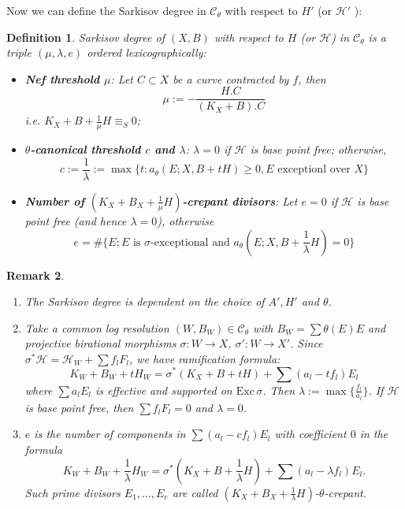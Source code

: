 \documentclass[11pt]{amsart}
\newtheorem{defn}{Definition}[section]
\newtheorem{rmk}[defn]{Remark}
\begin{document}
Now we can define the Sarkisov degree in $\mathcal{C}_{\theta}$ with respect to $H'$ (or $\mathcal{H}'$ ):
\begin{defn}\label{sarkisovdegree}
  \cite[Definition 3.8]{brunoLogSarkisovProgram1995}
  Sarkisov degree of $ (X,B) $ with respect to $ H $ (or $ \mathcal{H} $) in $ \mathcal{C}_\theta $ is a triple $ (\mu,\lambda,e) $ ordered lexicographically:
  \begin{itemize}
    \item \textbf{Nef threshold $ \mu $}: Let $ C\subset X  $ be a curve contracted by $ f $, then 
      \[ \mu:=-\frac{H.C}{(K_X+B).C} \]
      i.e. $ K_X+B+\frac{1}{\mu} H \equiv_S0$;
    \item \textbf{$ \theta $-canonical threshold $c$ and $ \lambda $}: $\lambda=0$ if $ \mathcal{H} $ is base point free; otherwise,
      \[ c:=\frac{1}{\lambda}:=\max\{t:a_{\theta}(E;X,B+tH)\geqslant 0 ,E\text{ exceptionl over }X \}\] 
    \item \textbf{Number of $(K_{X}+B_{X}+\frac{1}{\mu}H)$-crepant divisors}: Let $ e=0 $ if $ \mathcal{H} $ is base point free (and hence $ \lambda=0 $), otherwise 
      \[ e=\#\{E; E \text{ is }\sigma\text{-exceptional and } a_{\theta}(E;X,B+\frac{1}{\lambda} H)=0 \} \]
  \end{itemize}
\end{defn}
\begin{rmk} 
 \begin{enumerate}
    \item  The Sarkisov degree is dependent on the choice of  $A', H'$ and  $\theta$.
   \item Take a common log resolution  $ (W,B_W)\in \mathcal{C}_\theta $ with $ B_W=\sum \theta(E)E $ and projective birational morphisms $ \sigma:W\to X $, $ \sigma':W\to X' $. Since $\sigma^*\mathcal{H}=\mathcal{H}_W+\sum f_{l}F_{l}$, we have ramification formula:
      \[ K_W+B_W+tH_W=\sigma^*(K_X+B+tH)+\sum(a_l-tf_l)E_l \]
      where $ \sum a_lE_l $ is effective and supported on $ \mathrm{Exc}\,\sigma $. Then $\lambda:=\max\{ \frac{f_l}{a_l}\}$. If $ \mathcal{H} $ is base point free, then $ \sum f_lF_l=0 $ and $\lambda=0  $.
      \item   $ e $ is the number of components in $\sum(a_l-cf_l)E_l$ with coefficient $ 0 $ in the formula
      \[ K_W+B_W+\frac{1}{\lambda} H_W=\sigma^*(K_X+B+\frac{1}{\lambda} H)+\sum(a_l-\lambda f_l)E_l .\]
      Such prime divisors $E_{1},\ldots, E_{e}$ are called $(K_{X}+B_{X}+\frac{1}{\lambda}H)$-$\theta$-crepant.
 \end{enumerate} 
\end{rmk}
\end{document}
